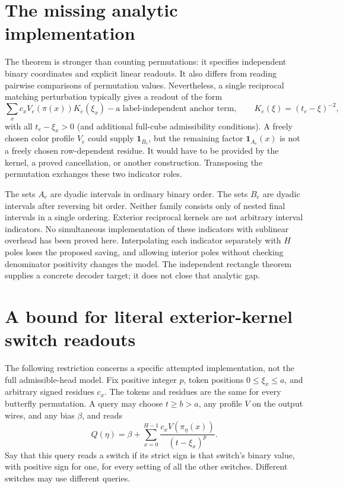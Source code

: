 \documentclass[11pt]{article}
\begin{document}
\section{The missing analytic implementation}
The theorem is stronger than counting permutations: it specifies
independent binary coordinates and explicit linear readouts. It also
differs from reading pairwise comparisons of permutation values.
Nevertheless, a single reciprocal matching perturbation typically
gives a readout of the form
\[
 \sum_x c_x V_e(\pi(x))K_e(\xi_x)
       -\text{a label-independent anchor term},
 \qquad K_e(\xi)=(t_e-\xi)^{-2},
\]
with all $t_e-\xi_x>0$ (and additional full-cube admissibility
conditions). A freely chosen color profile $V_e$ could supply
$\mathbf1_{B_e}$, but the remaining factor
$\mathbf1_{A_e}(x)$ is not a freely chosen row-dependent residue.
It would have to be provided by the kernel, a proved cancellation,
or another construction. Transposing the permutation exchanges
these two indicator roles.

The sets $A_e$ are dyadic intervals in ordinary binary order. The
sets $B_e$ are dyadic intervals after reversing bit order. Neither
family consists only of nested final intervals in a single ordering.
Exterior reciprocal kernels are not arbitrary interval indicators.
No simultaneous implementation of these indicators with sublinear
overhead has been proved here. Interpolating each indicator
separately with $H$ poles loses the proposed saving, and allowing
interior poles without checking denominator positivity changes the
model. The independent rectangle theorem supplies a concrete decoder
target; it does not close that analytic gap.

\section{A bound for literal exterior-kernel switch readouts}
The following restriction concerns a specific attempted implementation,
not the full admissible-head model. Fix positive integer $p$, token
positions $0\leq\xi_x\leq a$, and arbitrary signed residues $c_x$.
The tokens and residues are the same for every butterfly permutation.
A query may choose $t\geq b>a$, any profile $V$ on the output wires,
and any bias $\beta$, and reads
\[
 Q(\eta)=\beta+\sum_{x=0}^{H-1}
       \frac{c_x V(\pi_\eta(x))}{(t-\xi_x)^p}.
 \tag{2}\label{eq:literal}
\]
Say that this query reads a switch if its strict sign is that switch's
binary value, with positive sign for one, for every setting of all the
other switches. Different switches may use different queries.
\end{document}
